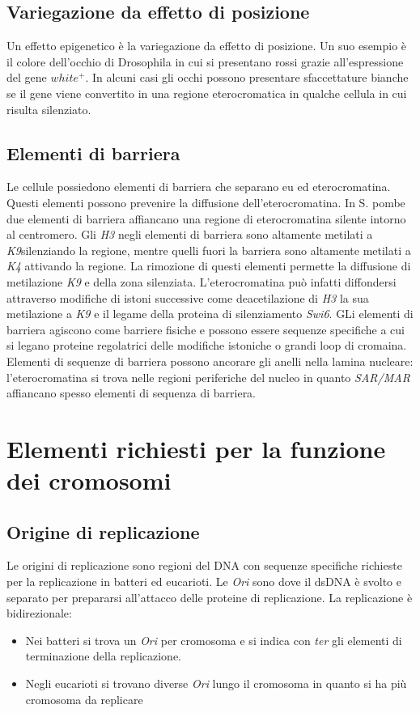 \subsection{Variegazione da effetto di posizione}
Un effetto epigenetico \`e la variegazione da effetto di posizione. Un suo esempio \`e il colore dell'occhio di Drosophila in cui si presentano rossi grazie all'espressione del gene 
$white^+$. In alcuni casi gli occhi possono presentare sfaccettature bianche se il gene viene convertito in una regione eterocromatica in qualche cellula in cui risulta silenziato.
\subsection{Elementi di barriera}
Le cellule possiedono elementi di barriera che separano eu ed eterocromatina. Questi elementi possono prevenire la diffusione dell'eterocromatina. In S. pombe due elementi di barriera
affiancano una regione di eterocromatina silente intorno al centromero. Gli \emph{H3} negli elementi di barriera sono altamente metilati a \emph{K9}silenziando la regione, mentre
quelli fuori la barriera sono altamente metilati a \emph{K4} attivando la regione. La rimozione di questi elementi permette la diffusione di metilazione \emph{K9} e della zona 
silenziata. L'eterocromatina pu\`o infatti diffondersi attraverso modifiche di istoni successive come deacetilazione di \emph{H3} la sua metilazione a \emph{K9} e il legame 
della proteina di silenziamento \emph{Swi6}. GLi elementi di barriera agiscono come barriere fisiche e possono essere sequenze specifiche a cui si legano proteine regolatrici delle
modifiche istoniche o grandi loop di cromaina. Elementi di sequenze di barriera possono ancorare gli anelli nella lamina nucleare: l'eterocromatina si trova nelle regioni periferiche
del nucleo in quanto \emph{SAR/MAR} affiancano spesso elementi di sequenza di barriera. 
\section{Elementi richiesti per la funzione dei cromosomi}
\subsection{Origine di replicazione}
Le origini di replicazione sono regioni del DNA con sequenze specifiche richieste per la replicazione in batteri ed eucarioti. Le \emph{Ori} sono dove il dsDNA \`e svolto e separato per 
prepararsi all'attacco delle proteine di replicazione. La replicazione \`e bidirezionale:
\begin{itemize}
	\item Nei batteri si trova un \emph{Ori} per cromosoma e si indica con \emph{ter} gli elementi di terminazione della replicazione.
	\item Negli eucarioti si trovano diverse \emph{Ori} lungo il cromosoma in quanto si ha pi\`u cromosoma da replicare
\end{itemize}
